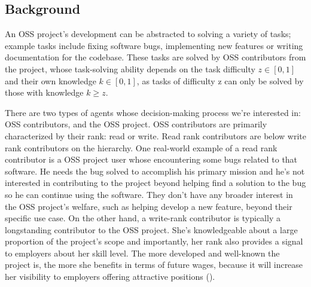 \documentclass[source/paper/main.tex]{subfiles}
\begin{document}
\subsection{Background}
An OSS project's development can be abstracted to solving a variety of tasks; example tasks include fixing software bugs, implementing new features or writing documentation for the codebase. These tasks are solved by OSS contributors from the project, whose task-solving ability depends on the task difficulty $z \in [0, 1]$ and their own knowledge $k \in [0, 1]$, as tasks of difficulty z can only be solved by those with knowledge $k \geq z$. 

\qquad There are two types of agents whose decision-making process we're interested in: OSS contributors, and the OSS project. OSS contributors are primarily characterized by their rank: read or write. Read rank contributors are below write rank contributors on the hierarchy.  One real-world example of a read rank contributor is a OSS project user whose encountering some bugs related to that software. He needs the bug solved to accomplish his primary mission and he's not interested in contributing to the project beyond helping find a solution to the bug so he can continue using the software. They don't have any broader interest in the OSS project's welfare, such as helping develop a new feature, beyond their specific use case. On the other hand, a write-rank contributor is typically a longstanding contributor to the OSS project. She's knowledgeable about a large proportion of the project's scope and importantly, her rank also provides a signal to employers about her skill level. The more developed and well-known the project is, the more she benefits in terms of future wages, because it will increase her visibility to employers offering attractive positions (\cite{hann_economic_2002}). 
\end{document}
